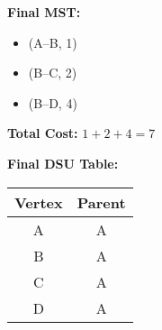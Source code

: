 \documentclass[14pt,a4paper]{extarticle}
\begin{document}
\vspace{1em}
\textbf{Final MST:}
\begin{itemize}
  \item (A--B, 1)
  \item (B--C, 2)
  \item (B--D, 4)
\end{itemize}

\textbf{Total Cost:} \(1 + 2 + 4 = 7\)

\vspace{1em}
\textbf{Final DSU Table:}

\begin{center}
\begin{tabular}{|c|c|}
\hline
Vertex & Parent \\
\hline
A & A \\
B & A \\
C & A \\
D & A \\
\hline
\end{tabular}
\end{center}






\newpage
\end{document}
